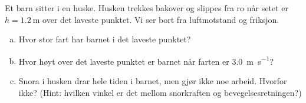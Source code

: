 %
Et barn sitter i en huske. Husken trekkes bakover og slippes fra ro når setet er $h = \SI{1.2}{\metre}$ over det laveste punktet. Vi ser bort fra luftmotstand og friksjon.
\begin{enumerate}[a)]
    \item Hvor stor fart har barnet i det laveste punktet?
    \item Hvor høyt over det laveste punktet er barnet når farten er \SI{3.0}{\metre\per\second}?
    \item Snora i husken drar hele tiden i barnet, men gjør ikke noe arbeid. Hvorfor ikke? (Hint: hvilken vinkel er det mellom snorkraften og bevegelsesretningen?)
\end{enumerate}
